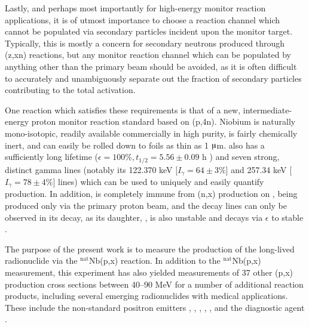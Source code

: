 \documentclass[3p]{elsarticle}
\begin{document}
Lastly, and perhaps most importantly for high-energy monitor reaction applications, it is  of utmost importance to choose a reaction channel which cannot be populated via secondary particles incident upon the monitor target.
Typically, this is  mostly a concern for secondary neutrons produced through (z,xn) reactions, 
but any monitor reaction channel which can be populated by anything other than the primary beam should be avoided, as it is often 
difficult to accurately and unambiguously separate out the fraction of secondary particles contributing to the total activation.  





One  reaction which satisfies these requirements is that of a new, intermediate-energy proton monitor reaction standard based on (p,4n). 
Niobium is naturally mono-isotopic, readily  available commercially in high purity, is fairly chemically inert, and can easily be rolled down to foils as thin as 1 $\micro$m.  
 also has 
a sufficiently long lifetime ($\epsilon=100\%, t_{1/2}=5.56 \pm 0.09$ h \cite{Browne1997})  
and seven strong, distinct gamma lines (notably its 122.370 keV [$I_\gamma = 64 \pm 3\%$] and 257.34 keV [$I_\gamma = 78 \pm 4\%$] lines) which can be used to uniquely and easily   quantify  production. 
In addition,   is completely immune from (n,x) production on  , being produced only via the primary proton beam, and the  decay lines can only be observed in its decay, as its daughter, , is also unstable and decays via $\epsilon$ to stable . 
 
The purpose of the present work is to  measure the production of the long-lived radionuclide   
via the $^\text{nat}$Nb(p,x) reaction. 
In addition to the $^\text{nat}$Nb(p,x) measurement, this experiment has also yielded measurements of 37 other (p,x) production cross sections between 40--90 MeV  for a number of additional reaction products, including several emerging radionuclides with medical applications.
These include the non-standard positron emitters , ,  , ,  , 
and the diagnostic agent . 
\end{document}
